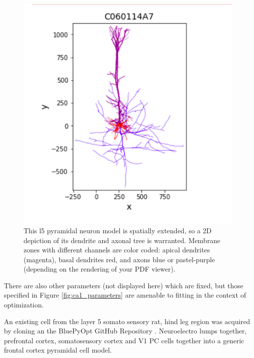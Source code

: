 \begin{figure}%
  \begin{center}
    \includegraphics[scale=0.8]{figures/morphology_view.png}
    \caption[Visualization of the Layer 5 Pyramidal neuron Tree Form]{This l5 pyramidal neuron model is spatially extended, so a 2D depiction of its dendrite and axonal tree is warranted.
    Membrane zones with different channels are color coded: apical dendrites (magenta), basal dendrites red, and axons blue or pastel-purple (depending on the rendering of your PDF viewer).
    }
  \label{fig:brief_shape}
  \end{center}
\end{figure}


There are also other parameters (not displayed here) which are fixed, but those specified in Figure  \ref{fig:ca1_parameters} are amenable to fitting in the context of optimization.


An existing cell from the layer 5 somato sensory rat, hind leg region was acquired by cloning an the BluePyOpt GitHub Repository \cite{van2016bluepyopt}.
Neuroelectro lumps together, prefrontal cortex, somatosensory cortex and V1 PC cells together into a generic frontal cortex pyramidal cell model. 


